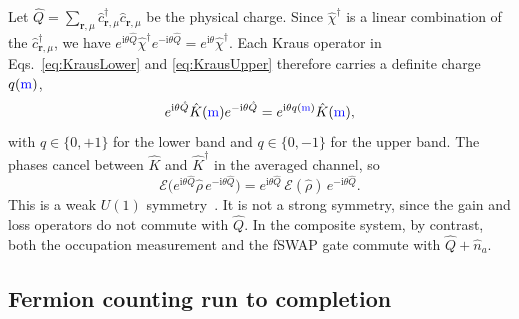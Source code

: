 \documentclass[aps,prb,10pt,twocolumn,superscriptaddress,longbibliography,floatfix]{revtex4-2}
\newcommand{\ii}{\mathrm{i}}
\newcommand{\mc}[1]{\mathcal{#1}}
\newcommand{\bfr}{\boldsymbol r}
\newcommand{\newtext}[1]{{\color{blue}#1}}
\begin{document}
Let $\hat Q=\sum_{\bfr,\mu}\hat c^\dagger_{\bfr,\mu}\hat c_{\bfr,\mu}$ be the physical charge. Since $\hat\chi^\dagger$ is a linear combination of the $\hat c^\dagger_{\bfr,\mu}$, we have $e^{\ii\theta\hat Q}\hat\chi^\dagger e^{-\ii\theta\hat Q}=e^{\ii\theta}\hat\chi^\dagger$. Each Kraus operator in Eqs.~\eqref{eq:KrausLower} and \eqref{eq:KrausUpper} therefore carries a definite charge $q(\newtext{\mathrm{m}})$,
\begin{equation}
    e^{\ii\theta\hat Q}\hat K(\newtext{\mathrm{m}})e^{-\ii\theta\hat Q}=e^{\ii\theta q(\newtext{\mathrm{m}})}\hat K(\newtext{\mathrm{m}}),
    \label{eq:KrausCharge}
\end{equation}
with $q\in\{0,+1\}$ for the lower band and $q\in\{0,-1\}$ for the upper band. The phases cancel between $\hat K$ and $\hat K^\dagger$ in the averaged channel, so
\begin{equation}
    \mc E\big(e^{\ii\theta\hat Q}\hat\rho\,e^{-\ii\theta\hat Q}\big)=e^{\ii\theta\hat Q}\,\mc E(\hat\rho)\,e^{-\ii\theta\hat Q}.
    \label{eq:WeakU1}
\end{equation}
This is a weak $U(1)$ symmetry~\cite{BucaProsen2012,AlbertJiang2014}. It is not a strong symmetry, since the gain and loss operators do not commute with $\hat Q$. In the composite system, by contrast, both the occupation measurement and the fSWAP gate commute with $\hat Q+\hat n_a$.

\subsection{Fermion counting run to completion}
\end{document}

